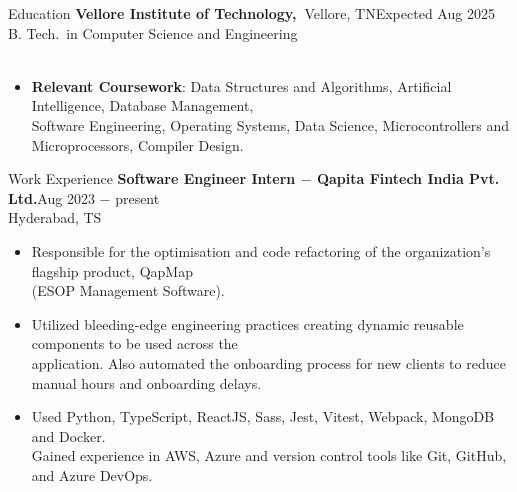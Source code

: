 \documentclass{resume}
\begin{document}
\vspace{-\baselineskip}


\begin{rSection}{Education}
      \textbf{Vellore Institute of Technology,~}{Vellore, TN}\hfill {Expected Aug 2025}
      \\ {B. Tech.\ in Computer Science and Engineering}\\ \
      \vspace{-\parskip}
      \vspace{-\parsep}
      \begin{itemize}
            \vspace{-0.5\baselineskip}
            \item {
                  \textbf{Relevant Coursework}: {Data Structures and Algorithms, Artificial Intelligence, Database Management, \\
                  Software Engineering, Operating Systems, Data Science, Microcontrollers and Microprocessors, Compiler Design.}
                  }
      \end{itemize}
\end{rSection}


\vspace{-0.5\baselineskip}


\begin{rSection}{Work Experience}
      {\textbf{Software Engineer Intern $-$ Qapita Fintech India Pvt. Ltd.}}\hfill Aug 2023 $-$ present\\
      {Hyderabad, TS}
      \vspace{-0.5\baselineskip}
      \begin{itemize}
            \item {
                  Responsible for the optimisation and code refactoring of the organization's flagship product, QapMap \\
                  (ESOP Management Software).
                  }
            \item {
                  Utilized bleeding-edge engineering practices creating dynamic reusable components to be used across the \\
                  application. Also automated the onboarding process for new clients to reduce manual hours and onboarding delays.
                  }
            \item {
                  Used Python, TypeScript, ReactJS, Sass, Jest, Vitest, Webpack, MongoDB and Docker. \\
                  Gained experience in AWS, Azure and version control tools like Git, GitHub, and Azure DevOps.
                  }
      \end{itemize}
\end{rSection}
\end{document}
